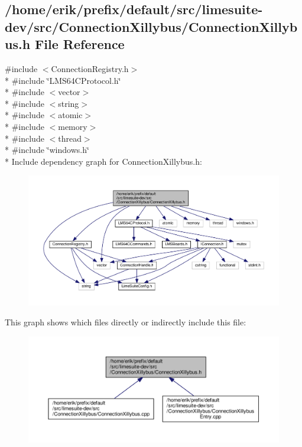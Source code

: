 \subsection{/home/erik/prefix/default/src/limesuite-\/dev/src/\+Connection\+Xillybus/\+Connection\+Xillybus.h File Reference}
\label{ConnectionXillybus_8h}
{\ttfamily \#include $<$Connection\+Registry.\+h$>$}\\*
{\ttfamily \#include \char`\"{}L\+M\+S64\+C\+Protocol.\+h\char`\"{}}\\*
{\ttfamily \#include $<$vector$>$}\\*
{\ttfamily \#include $<$string$>$}\\*
{\ttfamily \#include $<$atomic$>$}\\*
{\ttfamily \#include $<$memory$>$}\\*
{\ttfamily \#include $<$thread$>$}\\*
{\ttfamily \#include \char`\"{}windows.\+h\char`\"{}}\\*
Include dependency graph for Connection\+Xillybus.\+h\+:
\nopagebreak
\begin{figure}[H]
\begin{center}
\leavevmode
\includegraphics[width=350pt]{d5/de1/ConnectionXillybus_8h__incl}
\end{center}
\end{figure}
This graph shows which files directly or indirectly include this file\+:
\nopagebreak
\begin{figure}[H]
\begin{center}
\leavevmode
\includegraphics[width=350pt]{de/d74/ConnectionXillybus_8h__dep__incl}
\end{center}
\end{figure}
